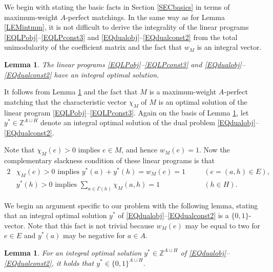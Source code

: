 \documentclass[11pt,a4paper,showkeys]{article}
\theoremstyle{plain}
\newtheorem{lemma}[theorem]{Lemma}
\theoremstyle{definition}
\newcommand{\ZZ}{{\mathbb{Z}}}
\begin{document}
We begin with stating the basic facts in Section \ref{SECbasics} in terms of maximum-weight $A$-perfect matchings. 
In the same way as for Lemma \ref{LEMintmm}, 
it is not difficult to derive the integrality of the linear programs \eqref{EQLPobj}--\eqref{EQLPconst3} 
and \eqref{EQdualobj}--\eqref{EQdualconst2} from the total unimodularity of 
the coefficient matrix 
and the fact that $w_M$ is an integral vector. 
\begin{lemma}
\label{LEMint}
The linear programs \eqref{EQLPobj}--\eqref{EQLPconst3} and \eqref{EQdualobj}--\eqref{EQdualconst2} have an integral optimal solution. 
\end{lemma}


It follows from Lemma \ref{LEMint} and the fact that $M$ is a maximum-weight $A$-perfect matching that 
the characteristic vector $\chi_M$ of $M$ is an optimal solution of the linear program \eqref{EQLPobj}--\eqref{EQLPconst3}. 
Again on the basis of Lemma \ref{LEMint}, 
let $y^*\in \ZZ^{A\cup H}$ denote an integral optimal solution of 
the dual problem \eqref{EQdualobj}--\eqref{EQdualconst2}. 

Note that $\chi_M(e) > 0$ implies $e\in M$, and hence $w_M(e)=1$. 
Now 
the complementary slackness condition of these linear programs is that 
\begin{alignat}{2}
    \label{EQCS1}
    &{}\mbox{$\chi_M(e) > 0$ implies $y^*(a)+y^*(h)= w_M(e)=1$}& \quad &(e=(a,h)\in E),\\
    \label{EQCS2}
    &{}\mbox{$y^*(h) > 0$ implies $\displaystyle\sum_{a\in \Gamma(h)}\chi_M(a,h)= 1$}& \quad& (h\in H).
\end{alignat}

We begin an argument specific to our problem with the following lemma, 
stating that an integral optimal solution $y^*$ of \eqref{EQdualobj}--\eqref{EQdualconst2} is a $\{0,1\}$-vector. 
Note that this fact is not trivial because 
$w_M(e)$ may be equal to two for $e\in E$ and 
$y^*(a)$ may be negative for $a\in A$. 

\begin{lemma}
\label{LEMy01}
    For an integral optimal solution $y^* \in \ZZ^{A\cup H}$ of \eqref{EQdualobj}--\eqref{EQdualconst2}, 
    it holds that $y^* \in \{0,1\}^{A\cup H}$. 
\end{lemma}
\end{document}
